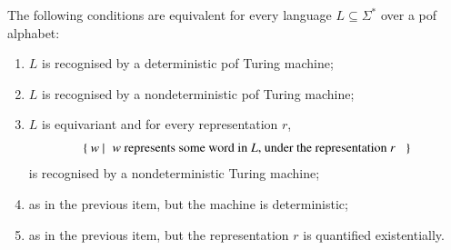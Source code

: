 \begin{theorem}\label{thm:pof-turing}
    The following conditions are equivalent for every language $L \subseteq \Sigma^*$ over a pof alphabet:
    \begin{enumerate}
        \item \label{item:turing-pof-det-pof} $L$ is recognised by a deterministic pof  Turing machine;
        \item \label{item:turing-pof-nondet-pof} $L$ is recognised by a nondeterministic pof  Turing machine;
        \item \label{item:turing-pof-every-rep} $L$ is equivariant and for every representation $r$, 
        \begin{align*}
            \setbuild{ w }{ $w$ represents some word in $L$, under the representation $r$ }
            \end{align*}
         is recognised by  a nondeterministic  Turing machine;
        \item \label{item:turing-pof-every-rep-det} as in the previous item, but the machine is deterministic;
        \item \label{item:turing-pof-some-rep} as in the previous item, but the representation $r$ is quantified existentially.
    \end{enumerate}
\end{theorem}
